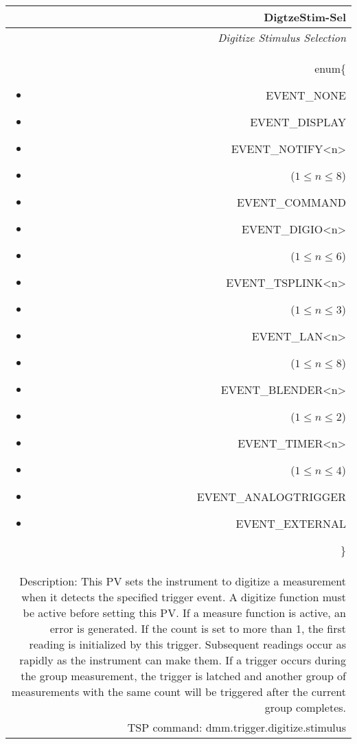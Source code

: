 \documentclass[openany]{article}
\begin{document}
		\begin{tabular}{N}
			\hline
			\bfseries DigtzeStim-Sel\label{pv:digtzestim-sel} \\ \hline
			\emph{Digitize Stimulus Selection} \\
			enum\{\begin{itemize}[noitemsep]
				\small
				\item[] EVENT\_NONE
				\item[] EVENT\_DISPLAY
				\item[] EVENT\_NOTIFY\textless n\textgreater
				\item[] ($1\leq n\leq 8$)
				\item[] EVENT\_COMMAND
				\item[] EVENT\_DIGIO\textless n\textgreater
				\item[] ($1\leq n\leq 6$)
				\item[] EVENT\_TSPLINK\textless n\textgreater
				\item[] ($1\leq n\leq 3$)
				\item[] EVENT\_LAN\textless n\textgreater
				\item[] ($1\leq n\leq 8$)
				\item[] EVENT\_BLENDER\textless n\textgreater 
				\item[] ($1\leq n\leq 2$)
				\item[] EVENT\_TIMER\textless n\textgreater
				\item[] ($1\leq n\leq 4$)
				\item[] EVENT\_ANALOGTRIGGER
				\item[] EVENT\_EXTERNAL
			\end{itemize}\} \\
			Description: This PV sets the instrument to digitize a measurement when it detects the specified trigger event. A digitize function must be active before setting this PV. If a measure function is active, an error is generated. If the count is set to more than 1, the first reading is initialized by this trigger. Subsequent readings occur as rapidly as the instrument can make them. If a trigger occurs during the group measurement, the trigger is latched and another group of measurements with the same count will be triggered after the current group completes. \\
			TSP command: dmm.trigger.digitize.stimulus
		\end{tabular}
\end{document}
